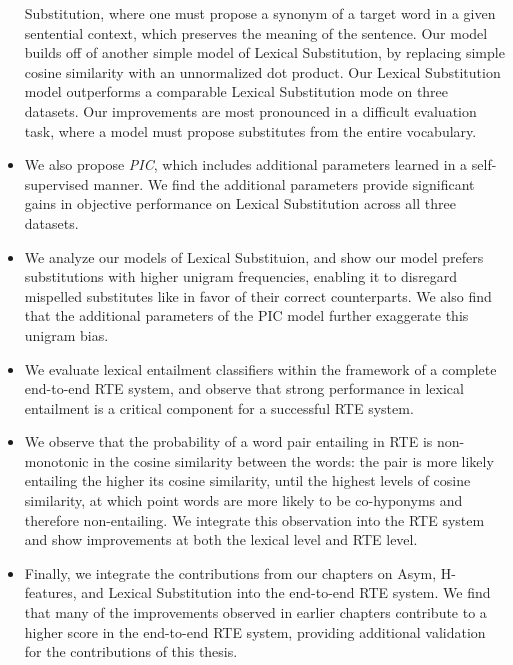 \begin{itemize}
    Substitution, where one must propose a synonym of a target word in a given
    sentential context, which preserves the meaning of the sentence. Our model
    builds off of another simple model of Lexical Substitution, by replacing
    simple cosine similarity with an unnormalized dot product. Our Lexical
    Substitution model outperforms a comparable Lexical Substitution mode on
    three datasets. Our improvements are most pronounced in a difficult
    evaluation task, where a model must propose substitutes from the entire
    vocabulary.
  \item We also propose {\em PIC}, which includes additional parameters
    learned in a self-supervised manner. We find the additional parameters
    provide significant gains in objective performance on Lexical Substitution
    across all three datasets.
  \item We analyze our models of Lexical Substituion, and show our model
    prefers substitutions  with higher unigram frequencies, enabling it to
    disregard mispelled substitutes like  in favor of
    their correct counterparts. We also find that the additional parameters
    of the PIC model further exaggerate this unigram bias.
  \item We evaluate lexical entailment classifiers within the framework of
    a complete end-to-end RTE system, and observe that strong performance
    in lexical entailment is a critical component for a successful RTE system.
  \item We observe that the probability of a word pair entailing in RTE is
    non-monotonic in the cosine similarity between the words: the pair is
    more likely entailing the higher its cosine similarity, until the
    highest levels of cosine similarity, at which point words are more likely
    to be co-hyponyms and therefore non-entailing. We integrate this observation
    into the RTE system and show improvements at both the lexical level and
    RTE level.
  \item Finally, we integrate the contributions from our chapters on
    Asym, H-features, and Lexical Substitution into the end-to-end RTE system.
    We find that many of the improvements observed in earlier chapters contribute
    to a higher score in the end-to-end RTE system, providing additional
    validation for the contributions of this thesis.
\end{itemize}


